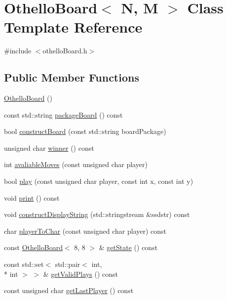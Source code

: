 \hypertarget{classOthelloBoard}{\section{Othello\-Board$<$ N, M $>$ Class Template Reference}
\label{classOthelloBoard}
}


{\ttfamily \#include $<$othello\-Board.\-h$>$}

\subsection*{Public Member Functions}
\begin{DoxyCompactItemize}
\item 
\hyperlink{classOthelloBoard_a3f996705018ff9d27657bc0b724e857f}{Othello\-Board} ()
\item 
const std\-::string \hyperlink{classOthelloBoard_a91b476e5d89605400e93eab7f2f3ca2d}{package\-Board} () const 
\item 
bool \hyperlink{classOthelloBoard_ae2ac8bc8fd191a029207fcd5ad096d92}{construct\-Board} (const std\-::string board\-Package)
\item 
unsigned char \hyperlink{classOthelloBoard_a2303029a0e36c94dcc12903592287e3a}{winner} () const 
\item 
int \hyperlink{classOthelloBoard_a876a2168b743b1a36d58f8191bd2bda0}{avaliable\-Moves} (const unsigned char player)
\item 
bool \hyperlink{classOthelloBoard_a9d50536c87a0e73882d845815bf72b65}{play} (const unsigned char player, const int x, const int y)
\item 
void \hyperlink{classOthelloBoard_aeb67c1d90f64fee5c1c63fbfe4330a11}{print} () const 
\item 
void \hyperlink{classOthelloBoard_a76077193286df75737e0ce23e83bb70c}{construct\-Display\-String} (std\-::stringstream \&ssdstr) const 
\item 
char \hyperlink{classOthelloBoard_ac33b6f65bc0e95efb82519ea36b07c1e}{player\-To\-Char} (const unsigned char player) const 
\item 
const \hyperlink{classOthelloBoard}{Othello\-Board}$<$ 8, 8 $>$ \& \hyperlink{classOthelloBoard_abb88de115c183847aa91a93176404783}{get\-State} () const 
\item 
const std\-::set$<$ std\-::pair$<$ int, \\*
int $>$ $>$ \& \hyperlink{classOthelloBoard_a24c36f4b8d92934aacd63ddfff8a8941}{get\-Valid\-Plays} () const 
\item 
const unsigned char \hyperlink{classOthelloBoard_a3b1d8204a1f096cd818431621453f54d}{get\-Last\-Player} () const 
\end{DoxyCompactItemize}
